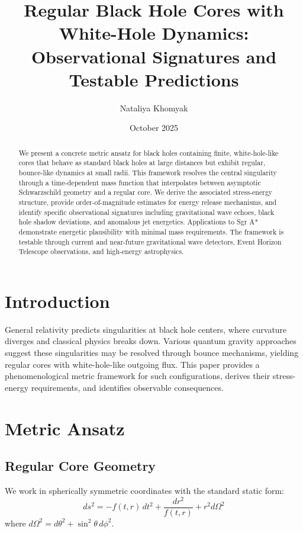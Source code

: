 \documentclass[11pt,a4paper]{article}
\title{Regular Black Hole Cores with White-Hole Dynamics: \\
Observational Signatures and Testable Predictions}
\author{Nataliya Khomyak}
\date{October 2025}
\begin{document}
\maketitle

\begin{abstract}
We present a concrete metric ansatz for black holes containing finite, white-hole-like cores that behave as standard black holes at large distances but exhibit regular, bounce-like dynamics at small radii. This framework resolves the central singularity through a time-dependent mass function that interpolates between asymptotic Schwarzschild geometry and a regular core. We derive the associated stress-energy structure, provide order-of-magnitude estimates for energy release mechanisms, and identify specific observational signatures including gravitational wave echoes, black hole shadow deviations, and anomalous jet energetics. Applications to Sgr A* demonstrate energetic plausibility with minimal mass requirements. The framework is testable through current and near-future gravitational wave detectors, Event Horizon Telescope observations, and high-energy astrophysics.
\end{abstract}

\section{Introduction}

General relativity predicts singularities at black hole centers, where curvature diverges and classical physics breaks down. Various quantum gravity approaches suggest these singularities may be resolved through bounce mechanisms, yielding regular cores with white-hole-like outgoing flux. This paper provides a phenomenological metric framework for such configurations, derives their stress-energy requirements, and identifies observable consequences.

\section{Metric Ansatz}

\subsection{Regular Core Geometry}

We work in spherically symmetric coordinates with the standard static form:
\begin{equation}
ds^2 = -f(t,r)\,dt^2 + \frac{dr^2}{f(t,r)} + r^2 d\Omega^2
\end{equation}
where $d\Omega^2 = d\theta^2+\sin^2\theta\,d\phi^2$.
\end{document}
